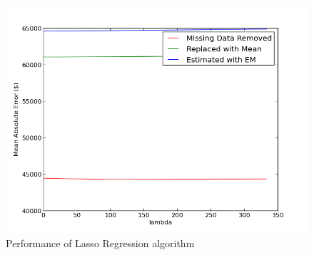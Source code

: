 \documentclass{acm_proc_article-sp}
\begin{document}
	 \begin{figure}[!htbp]
   		\centering
  		\includegraphics[width=\linewidth]{lasso_tuning_plot.png}
    		\caption{Performance of Lasso Regression algorithm}
    		\label{fig:lassoreg}
	\end{figure}
	
\end{document}
